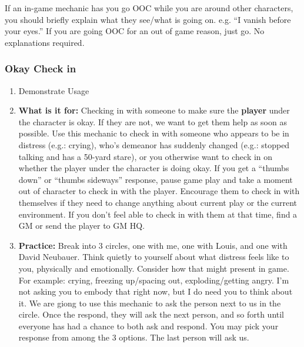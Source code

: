 \documentclass[green]{GL2020}
\begin{document}
If an in-game mechanic has you go OOC while you are around other characters, you should briefly explain what they see/what is going on. e.g. ``I vanish before your eyes.'' If you are going OOC for an out of game reason, just go. No explanations required.

\subsubsection*{Okay Check in}
\begin{enumerate}
	\item Demonstrate Usage
	\item \textbf{What is it for:} Checking in with someone to make sure the \textbf{player} under the character is okay. If they are not, we want to get them help as soon as possible. Use this mechanic to check in with someone who appears to be in distress (e.g.: crying), who’s demeanor has suddenly changed (e.g.: stopped talking and has a 50-yard stare), or you otherwise want to check in on whether the player under the character is doing okay. If you get a ``thumbs down'' or ``thumbs sideways'' response, pause game play and take a moment out of character to check in with the player. Encourage them to check in with themselves if they need to change anything about current play or the current environment. If you don’t feel able to check in with them at that time, find a GM or send the player to GM HQ.
	\item \textbf{Practice:} Break into 3 circles, one with me, one with Louis, and one with David Neubauer. Think quietly to yourself about what distress feels like to you, physically and emotionally. Consider how that might present in game. For example: crying, freezing up/spacing out, exploding/getting angry. I’m not asking you to embody that right now, but I do need you to think about it. We are giong to use this mechanic to ask the person next to us in the circle. Once the respond, they will ask the next person, and so forth until everyone has had a chance to both ask and respond. You may pick your response from among the 3 options. The last person will ask us.
\end{enumerate}
\end{document}
